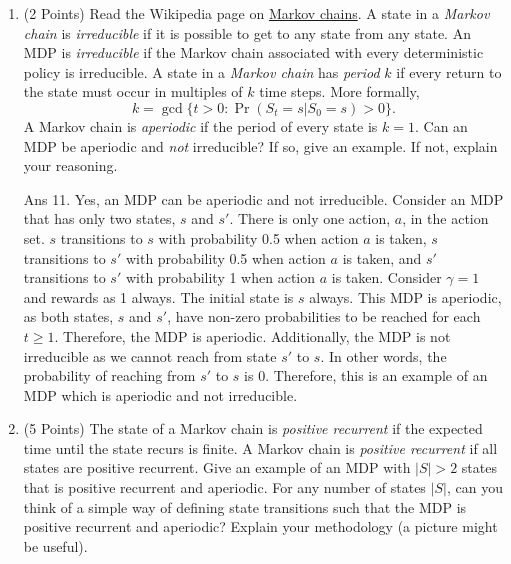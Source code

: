 \documentclass[]{article}
\begin{document}
\begin{enumerate}
{	}
    
    \item (2 Points) Read the Wikipedia page on \href{https://en.wikipedia.org/wiki/Markov_chain}{Markov chains}. A state in a \emph{Markov chain} is \emph{irreducible} if it is possible to get to any state from any state. An MDP is \emph{irreducible} if the Markov chain associated with every deterministic policy is irreducible. A state in a \emph{Markov chain} has \emph{period} $k$ if every return to the state must occur in multiples of $k$ time steps. More formally,
    $$
    k=\operatorname{gcd}\{t>0: \Pr (S_t=s|S_0=s)>0\}.
    $$
    A Markov chain is \emph{aperiodic} if the period of every state is $k=1$. Can an MDP be aperiodic and \emph{not} irreducible? If so, give an example. If not, explain your reasoning. 

	{
		\color{blue}
			Ans 11. Yes, an MDP can be aperiodic and not irreducible. Consider an MDP that has only two states, $s$ and $s'$. There is only one action, $a$, in the action set. $s$ transitions to $s$ with probability 0.5 when action $a$ is taken, $s$ transitions to $s'$ with probability 0.5 when action $a$ is taken, and $s'$ transitions to $s'$ with probability 1 when action $a$ is taken. Consider $\gamma = 1$ and rewards as 1 always. The initial state is $s$ always. This MDP is aperiodic, as both states, $s$ and $s'$, have non-zero probabilities to be reached for each $t \geq 1$. Therefore, the MDP is aperiodic. Additionally, the MDP is not irreducible as we cannot reach from state $s'$ to $s$. In other words, the probability of reaching from $s'$ to $s$ is 0. Therefore, this is an example of an MDP which is aperiodic  and not irreducible.
	}
			
    
   
    \item (5 Points) The state of a Markov chain is \emph{positive recurrent} if the expected time until the state recurs is finite. A Markov chain is \emph{positive recurrent} if all states are positive recurrent. Give an example of an MDP with $|S|>2$ states that is positive recurrent and aperiodic. For any number of states $|S|$, can you think of a simple way of defining state transitions such that the MDP is positive recurrent and aperiodic? Explain your methodology (a picture might be useful). 


\end{enumerate}
\end{document}
